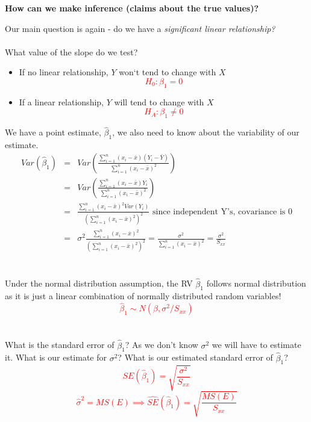 \newpage

\Large \textbf{How can we make inference (claims about the true values)?}  \large

Our main question is again - do we have a \textit{significant linear relationship?}\\~\\

What value of the slope do we test?
\begin{itemize}
\item If no linear relationship, $Y$ won`t tend to change with $X$ %
\textcolor{red}{$$H_0:\beta_1 = 0$$}
\item If a linear relationship, $Y$ will tend to change with $X$ %
\textcolor{red}{$$H_A:\beta_1 \neq 0$$}
\end{itemize}

We have a point estimate, $\hat{\beta}_1$, we also need to know about the variability of our estimate.
\begin{eqnarray*}
Var(\hat{\beta}_1)&=&Var\left(\frac{\sum_{i=1}^{n} (x_i-\bar{x})(Y_i-\bar{Y})}{\sum_{i=1}^{n} (x_i-\bar{x})^2}\right)\\
&=&Var\left(\frac{\sum_{i=1}^{n} (x_i-\bar{x})Y_i}{\sum_{i=1}^{n} (x_i-\bar{x})^2}\right)\\
&=&\frac{\sum_{i=1}^{n} (x_i-\bar{x})^2Var(Y_i)}{\left(\sum_{i=1}^{n} (x_i-\bar{x})^2\right)^2} \mbox{    since independent Y's, covariance is 0}\\
&=&\sigma^2\frac{\sum_{i=1}^{n} (x_i-\bar{x})^2}{\left(\sum_{i=1}^{n} (x_i-\bar{x})^2\right)^2}=\frac{\sigma^2}{\sum_{i=1}^{n} (x_i-\bar{x})^2}=\frac{\sigma^2}{S_{xx}}
\end{eqnarray*}
~\\~\\

Under the normal distribution assumption, the RV $\hat\beta_1$ follows normal distribution as it is just a linear combination of normally distributed random variables!%
\textcolor{red}{$$\hat{\beta}_1\sim N(\beta,\sigma^2/S_{xx})$$}~\\~\\

What is the standard error of $\hat{\beta}_1$?  As we don't know $\sigma^2$ we will have to estimate it.  What is our estimate for $\sigma^2$?  What is our estimated standard error of $\hat{\beta}_1$?%
\textcolor{red}{$$SE(\hat{\beta}_1)=\sqrt{\frac{\sigma^2}{S_{xx}}}$$
$$\hat{\sigma}^2=MS(E)\implies \hat{SE}(\hat{\beta}_1)=\sqrt{\frac{MS(E)}{S_{xx}}}$$}

